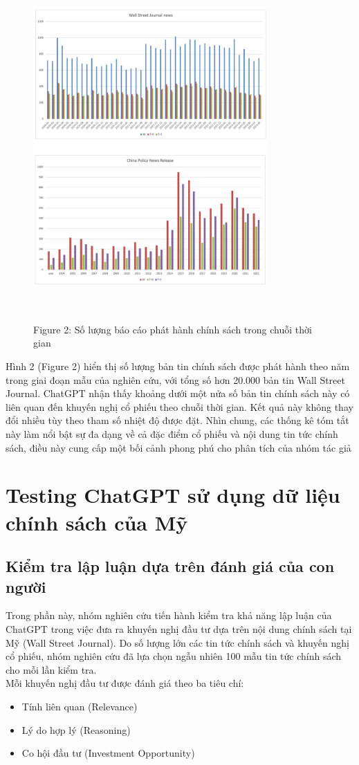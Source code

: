 \documentclass[a4paper,12pt]{article}
\begin{document}
\begin{figure}[H]
    \centering
    \includegraphics[width=0.8\textwidth]{fig/fig2.png}
    \caption*{Figure 2: Số lượng báo cáo phát hành chính sách trong chuỗi thời gian}
    \
\end{figure}
Hình 2 (Figure 2) hiển thị số lượng bản tin chính sách được phát hành theo năm trong giai đoạn mẫu của nghiên cứu, với tổng số hơn 20.000 bản tin Wall Street Journal. ChatGPT nhận thấy khoảng dưới một nửa số bản tin chính sách này có liên quan đến khuyến nghị cổ phiếu theo chuỗi thời gian. Kết quả này không thay đổi nhiều tùy theo tham số nhiệt độ được đặt. Nhìn chung, các thống kê tóm tắt này làm nổi bật sự đa dạng về cả đặc điểm cổ phiếu và nội dung tin tức chính sách, điều này cung cấp một bối cảnh phong phú cho phân tích của nhóm tác giả

\section{Testing ChatGPT sử dụng dữ liệu chính sách của Mỹ}

\subsection{Kiểm tra lập luận dựa trên đánh giá của con người}
Trong phần này, nhóm nghiên cứu tiến hành kiểm tra khả năng lập luận của ChatGPT trong việc đưa ra khuyến nghị đầu tư dựa trên nội dung chính sách tại Mỹ (Wall Street Journal). Do số lượng lớn các tin tức chính sách và khuyến nghị cổ phiếu, nhóm nghiên cứu đã lựa chọn ngẫu nhiên 100 mẫu tin tức chính sách cho mỗi lần kiểm tra.
\\ Mỗi khuyến nghị đầu tư được đánh giá theo ba tiêu chí:\begin{itemize}
    \item Tính liên quan (Relevance)
    \item Lý do hợp lý (Reasoning)
    \item Co hội đầu tư (Investment Opportunity)
\end{itemize}
\end{document}
